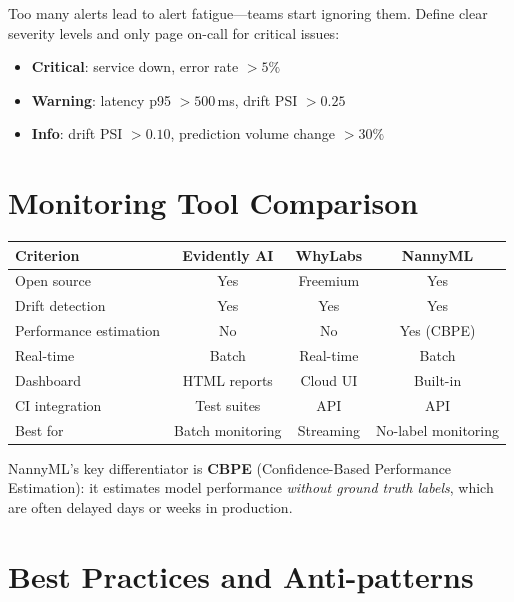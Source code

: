 \begin{warning}[title=\textbf{Alert fatigue}]
Too many alerts lead to alert fatigue---teams start ignoring them.
Define clear severity levels and only page on-call for critical issues:
\begin{itemize}
  \item \textbf{Critical}: service down, error rate $> 5\%$
  \item \textbf{Warning}: latency p95 $> 500$\,ms, drift PSI $> 0.25$
  \item \textbf{Info}: drift PSI $> 0.10$, prediction volume change
    $> 30\%$
\end{itemize}
\end{warning}

\section{Monitoring Tool Comparison}
\label{sec:monitoring-comparison}

\begin{center}
\begin{tabular}{@{}lccc@{}}
\toprule
\textbf{Criterion} & \textbf{Evidently AI} & \textbf{WhyLabs} &
  \textbf{NannyML} \\
\midrule
Open source & Yes & Freemium & Yes \\
Drift detection & Yes & Yes & Yes \\
Performance estimation & No & No & Yes (CBPE) \\
Real-time & Batch & Real-time & Batch \\
Dashboard & HTML reports & Cloud UI & Built-in \\
CI integration & Test suites & API & API \\
Best for & Batch monitoring & Streaming & No-label monitoring \\
\bottomrule
\end{tabular}
\end{center}

\begin{remark}
NannyML's key differentiator is \textbf{CBPE} (Confidence-Based
Performance Estimation): it estimates model performance \emph{without
ground truth labels}, which are often delayed days or weeks in
production.
\end{remark}

\section{Best Practices and Anti-patterns}

